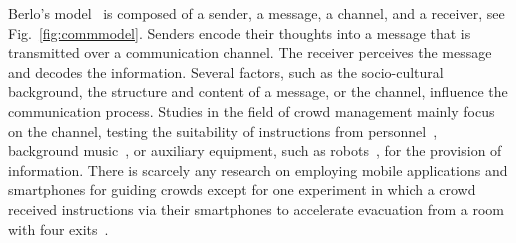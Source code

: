 Berlo's model~\cite{berlo-1960-life} is composed of a sender, a message, a channel, and a receiver, see Fig.~\ref{fig:commmodel}. 
Senders encode their thoughts into a message that is transmitted over a communication channel. The receiver perceives the message and decodes the information. Several factors, such as the socio-cultural background, the structure and content of a message, or the channel, influence the communication process. Studies in the field of crowd management mainly focus on the channel, testing the suitability of instructions from personnel~\cite{feliciani-2020b-cdyn}, background music~\cite{zeng-2019-cdyn}, or auxiliary equipment, such as robots~\cite{zhou-2019-cdyn}, for the provision of information. There is scarcely any research on employing mobile applications and smartphones for guiding crowds except for one experiment in which a crowd received instructions via their smartphones to accelerate evacuation from a room with four exits~\cite{feliciani-2020-cdyn}.







